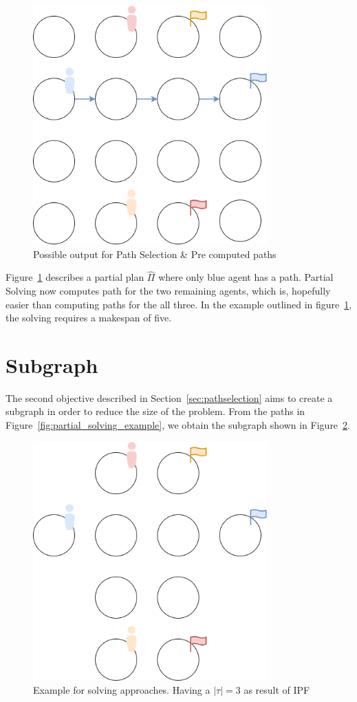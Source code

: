 \begin{figure}[H]
    \centering
    \caption{Possible output for Path Selection \& Pre computed paths}\label{fig:pre_computed_path_solving}
    \includegraphics[width=9cm]{img/pre_computed_path_solving.drawio.png}
\end{figure}

Figure~\ref{fig:pre_computed_path_solving} describes a partial plan \(\hat{\Pi}\) where only blue agent has a path. Partial Solving now computes path for the two remaining agents, which is, hopefully easier than computing paths for the all three. In the example outlined in figure~\ref{fig:pre_computed_path_solving}, the solving requires a makespan of five.

\section{Subgraph}

The second objective described in Section~\ref{sec:pathselection} aims to create a subgraph in order to reduce the size of the problem. From the paths in Figure~\ref{fig:partial_solving_example}, we obtain the subgraph shown in Figure~\ref{fig:subgraph_solving}.

\begin{figure}[H]
    \centering
    \caption{Example for solving approaches. Having a \(|\tau| = 3\) as result of IPF}\label{fig:subgraph_solving}
    \includegraphics[width=9cm]{img/subgraph_solving.png}
\end{figure}


